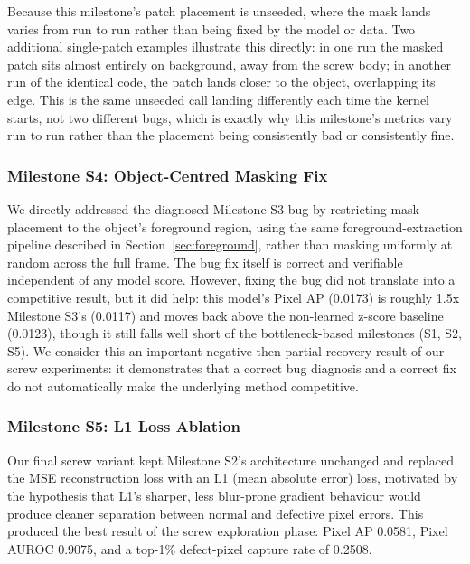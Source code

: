 Because this milestone's patch placement is unseeded, where the mask lands
varies from run to run rather than being fixed by the model or data. Two
additional single-patch examples illustrate this directly: in one run the
masked patch sits almost entirely on background, away from the screw body;
in another run of the identical code, the patch lands closer to the object,
overlapping its edge. This is the same unseeded call landing differently
each time the kernel starts, not two different bugs, which is exactly why
this milestone's metrics vary run to run rather than the placement being
consistently bad or consistently fine.

\subsubsection{Milestone S4: Object-Centred Masking Fix}

We directly addressed the diagnosed Milestone S3 bug by restricting mask
placement to the object's foreground region, using the same
foreground-extraction pipeline described in Section~\ref{sec:foreground}, rather than masking
uniformly at random across the full frame. The bug fix itself is correct and
verifiable independent of any model score. However, fixing the bug did not
translate into a competitive result, but it did help: this model's Pixel AP
(0.0173) is roughly 1.5x Milestone S3's (0.0117) and moves back above the
non-learned z-score baseline (0.0123), though it still falls well short of
the bottleneck-based milestones (S1, S2, S5). We consider this an important
negative-then-partial-recovery result of our screw experiments: it
demonstrates that a correct bug diagnosis and a correct fix do not
automatically make the underlying method competitive.

\subsubsection{Milestone S5: L1 Loss Ablation}

Our final screw variant kept Milestone S2's architecture unchanged and
replaced the MSE reconstruction loss with an L1 (mean absolute error) loss,
motivated by the hypothesis that L1's sharper, less blur-prone gradient
behaviour would produce cleaner separation between normal and defective pixel
errors. This produced the best result of the screw exploration phase: Pixel
AP 0.0581, Pixel AUROC 0.9075, and a top-1\% defect-pixel capture rate of
0.2508.

